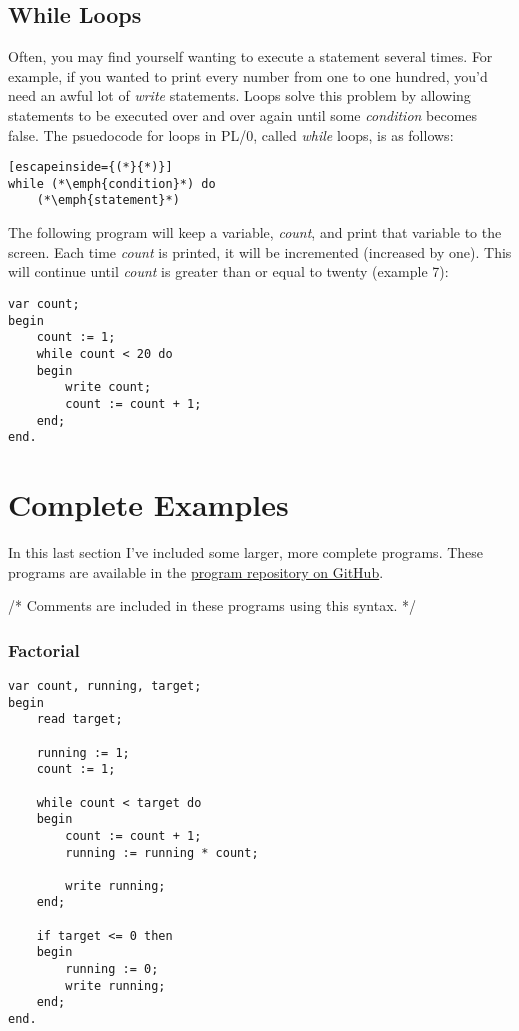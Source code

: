 \documentclass[12pt]{memoir}
\begin{document}
\subsection*{While Loops}
Often, you may find yourself wanting to execute a statement several times. For example,
if you wanted to print every number from one to one hundred, you'd need an awful lot of
\emph{write} statements. Loops solve this problem by allowing statements to be executed
over and over again until some \emph{condition} becomes false. The psuedocode for loops in PL/0,
called \emph{while} loops, is as follows:
\begin{lstlisting}[escapeinside={(*}{*)}]
while (*\emph{condition}*) do
    (*\emph{statement}*)
\end{lstlisting}
The following program will keep a variable, \emph{count}, and print that variable to the screen.
Each time \emph{count} is printed, it will be incremented (increased by one). This will
continue until \emph{count} is greater than or equal to twenty (example 7):
\begin{lstlisting}
var count;
begin
    count := 1;
    while count < 20 do
    begin
        write count;
        count := count + 1;
    end;
end.
\end{lstlisting}

\section*{Complete Examples}
In this last section I've included some larger, more complete programs. These programs
are available in the \href{https://www.github.com/tgsachse/plum}{program repository on GitHub}.

/* Comments are included in these programs using this syntax. */

\subsubsection*{Factorial}
\begin{lstlisting}
var count, running, target;
begin
    read target;

    running := 1;
    count := 1;

    while count < target do
    begin
        count := count + 1;
        running := running * count;
        
        write running;
    end;

    if target <= 0 then
    begin
        running := 0;
        write running;
    end;
end.
\end{lstlisting}
\end{document}
